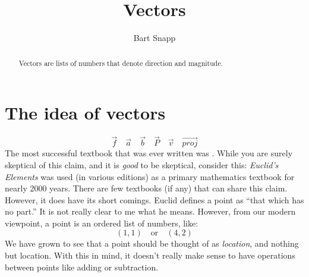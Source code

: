 \documentclass{ximera}
\author{Bart Snapp}
\title[Dig-In:]{Vectors}
\begin{document}
\begin{abstract}
  Vectors are lists of numbers that denote direction and magnitude.
\end{abstract}
\maketitle


\section{The idea of vectors}
\[
\vec{f} \quad \vec{a} \quad \vec{b} \quad \vec{P} \quad \vec{v} \quad \vec{proj}
\]
The most successful textbook that was ever written was . While
you are surely skeptical of this claim, and it is \textit{good} to be
skeptical, consider this: \textit{Euclid's Elements} was used (in
various editions) as a primary mathematics textbook for nearly 2000
years. There are few textbooks (if any) that can share this
claim. However, it does have its short comings. Euclid defines a point
as ``that which has no part.'' It is not really clear to me what he
means. However, from our modern viewpoint, a point is an ordered list
of numbers, like:
\[
(1,1)\quad\text{or}\quad(4,2)
\]
We have grown to see that a point should be thought of as
\textit{location}, and nothing but location. With this in mind, it
doesn't really make sense to have operations between points like
adding or subtraction.
\end{document}

